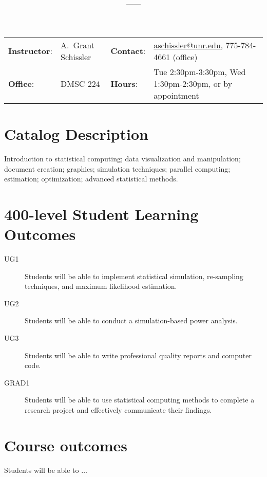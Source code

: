 \documentclass[11pt,onecolumn]{article}
\title{\textbf{\coursename}}
\author{{\semester}---{\roomnumb}---{\classtimes}}
\date{}
\makeatletter
\newcommand{\myname}{A.~Grant Schissler}
\newcommand{\myemail}{aschissler@unr.edu}
\newcommand{\office}{DMSC 224}
\newcommand{\officehours}{Tue 2:30pm-3:30pm, Wed 1:30pm-2:30pm, or by appointment}
\makeatother
\begin{document}
\maketitle

\vspace{-0.25in}
\noindent\makebox[\linewidth]{\rule{\textwidth}{1pt}}

\begin{center}
\begin{tabular}{llll}
\textbf{Instructor}:&\myname & \textbf{Contact}:&\href{mailto:\myemail}{\myemail}, 775-784-4661 (office)\\
\textbf{Office}:&\office & \textbf{Hours}:&\officehours\\
\end{tabular}
\end{center}

\section*{Catalog Description}
Introduction to statistical computing; data visualization and manipulation; document creation; graphics; simulation techniques; parallel computing; estimation; optimization; advanced statistical methods.

\section*{400-level Student Learning Outcomes}

\begin{description}
\item[UG1] Students will be able to implement statistical simulation, re-sampling techniques, and maximum likelihood estimation. 
\item[UG2] Students will be able to conduct a simulation-based power analysis. 
\item[UG3] Students will be able to write professional quality reports and computer code.
\item[GRAD1] Students will be able to use statistical computing methods to complete a research project and effectively communicate their findings.
\end{description}

\section*{Course outcomes}

Students will be able to $\ldots$
\end{document}
